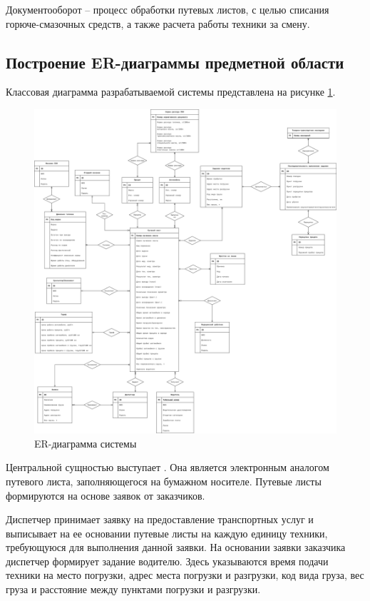 \documentclass[../nirs.tex]{subfiles}
\begin{document}
Документооборот -- процесс обработки путевых листов, с целью списания
горюче-смазочных средств, а также расчета работы техники за смену.

\subsection{Построение ER-диаграммы предметной области}
Классовая диаграмма разрабатываемой системы представлена на рисунке
\ref{fig:2_1_3_er_diagram}.

\begin{figure}[hp!]
	\centering
	\includegraphics[keepaspectratio,width=\textwidth]{./images/2_1_3_er-diagram.png}
	\caption{ER-диаграмма системы}
	\label{fig:2_1_3_er_diagram}
\end{figure}

Центральной сущностью выступает . Она является
электронным аналогом путевого листа, заполняющегося на бумажном носителе.
Путевые листы формируются на основе заявок от заказчиков.

Диспетчер принимает заявку на предоставление транспортных услуг и выписывает на
ее основании путевые листы на каждую единицу техники, требующуюся для выполнения
данной заявки. На основании заявки заказчика диспетчер формирует задание
водителю. Здесь указываются время подачи техники на место погрузки, адрес места
погрузки и разгрузки, код вида груза, вес груза и расстояние между пунктами
погрузки и разгрузки.
\end{document}
